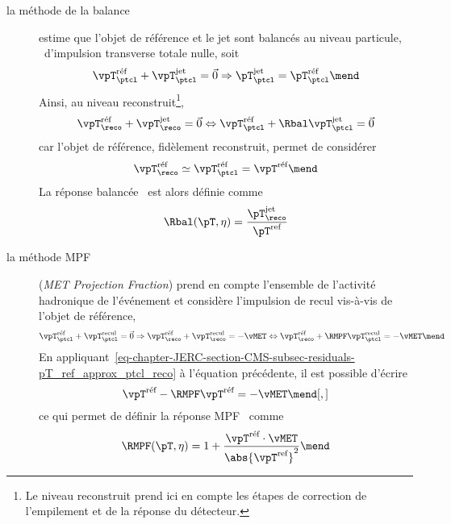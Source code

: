 \begin{description}
\item[la méthode de la balance] estime que l'objet de référence et le jet sont balancés au niveau particule, \ie\ d'impulsion transverse totale nulle, soit
\begin{equation}
\vpT_\ptcl^\text{réf} + \vpT_\ptcl^\text{jet} = \vec{0}
\Rightarrow
\pT_\ptcl^\text{jet} = \pT_\ptcl^\text{réf}
\mend
\end{equation}
Ainsi, au niveau reconstruit\footnote{Le niveau reconstruit prend ici en compte les étapes de correction de l'empilement et de la réponse du détecteur.},
\begin{equation}
\vpT_\reco^\text{réf} + \vpT_\reco^\text{jet} = \vec{0}
\Leftrightarrow
\vpT_\ptcl^\text{réf} + \Rbal\vpT_\ptcl^\text{jet} = \vec{0}
\end{equation}
car l'objet de référence, fidèlement reconstruit, permet de considérer
\begin{equation}
\vpT_\reco^\text{réf} \simeq \vpT_\ptcl^\text{réf} = \vpT^\text{réf}
\mend
\label{eq-chapter-JERC-section-CMS-subsec-residuals-pT_ref_approx_ptcl_reco}
\end{equation}
La réponse balancée \Rbal\ est alors définie comme
\begin{equation}
\Rbal (\pT, \eta) = \frac{\pT_\reco^\text{jet}}{\pT^\text{ref}}
\end{equation}
\item[la méthode \og MPF \fg] (\emph{MET Projection Fraction}) prend en compte l'ensemble de l'activité hadronique de l'événement et considère l'impulsion de recul vis-à-vis de l'objet de référence, \ie
\begin{equation}
\vpT_\ptcl^\text{réf} + \vpT_\ptcl^\text{recul} = \vec{0}
\Rightarrow
\vpT_\reco^\text{réf} + \vpT_\reco^\text{recul} = -\vMET
\Leftrightarrow
\vpT_\reco^\text{réf} + \RMPF\vpT_\ptcl^\text{recul} = -\vMET
\mend
\end{equation}
En appliquant~\eqref{eq-chapter-JERC-section-CMS-subsec-residuals-pT_ref_approx_ptcl_reco} à l'équation précédente, il est possible d'écrire
\begin{equation}
\vpT^\text{réf} - \RMPF\vpT^\text{réf} = -\vMET
\mend[,]
\end{equation}
ce qui permet de définir la réponse MPF \RMPF\ comme
\begin{equation}
\RMPF (\pT, \eta) = 1 + \frac{\vpT^\text{réf}\cdot\vMET}{\abs{\vpT^\text{ref}}^2}
\mend
\end{equation}
\end{description}
